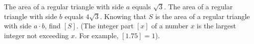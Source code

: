 The area of a regular triangle with side $a$ equals $\sqrt{3}$. The area of a regular triangle with side $b$ equals $4\sqrt{3}$. Knowing that $S$ is the area of a regular triangle with side $a \cdot b$, find $[S]$. (The integer part $[x]$ of a number $x$ is the largest integer not exceeding $x$. For example, $[1.75]=1$).
